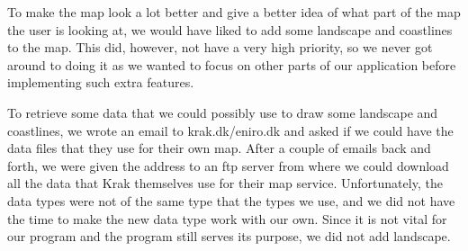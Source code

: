 To make the map look a lot better and give a better idea of what part of the map the user is looking at, we would have liked to add some landscape and coastlines to the map. This did, however, not have a very high priority, so we never got around to doing it as we wanted to focus on other parts of our application before implementing such extra features.

To retrieve some data that we could possibly use to draw some landscape and coastlines, we wrote an email to krak.dk/eniro.dk and asked if we could have the data files that they use for their own map. After a couple of emails back and forth, we were given the address to an ftp server from where we could download all the data that Krak themselves use for their map service. Unfortunately, the data types were not of the same type that the types we use, and we did not have the time to make the new data type work with our own. Since it is not vital for our program and the program still serves its purpose, we did not add landscape.